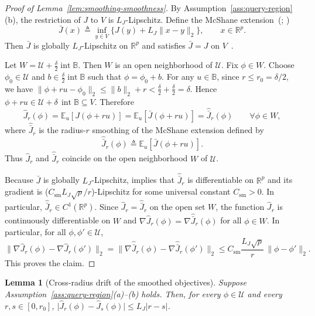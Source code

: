 \documentclass[11pt, letterpaper, oneside, reqno]{amsart}
\newcommand{\R}{\mathbb{R}}
\newcommand{\Let}{\triangleq}
\newtheorem{lemma}{Lemma}
\begin{document}
\begin{proof}[Proof of Lemma~\ref{lem:smoothing-smoothness}]
By Assumption~\ref{ass:query-region}(b), the restriction of $J$ to $V$ is $L_J$-Lipschitz.
Define the McShane extension~(\cite{ref:mcshane1934extension}; \cite[Definition~2.1]{ref:petrakis2020mcshane})
\[
\bar J(x)
\Let \inf_{y\in V}\bigl\{J(y)+L_J\|x-y\|_2\bigr\},
\qquad x\in\R^p.
\]
Then $\bar J$ is globally $L_J$-Lipschitz on $\R^p$ and satisfies $\bar J = J$ on $V$~\cite[Theorem~2.3]{ref:petrakis2020mcshane}.

Let $W = \mathcal U + \frac{\delta}{2}\operatorname{int}\mathbb B$.
Then $W$ is an open neighborhood of $\mathcal U$.
Fix $\phi\in W$. Choose $\phi_0\in\mathcal U$ and $b\in \frac{\delta}{2}\operatorname{int}\mathbb B$ such that $\phi=\phi_0+b$.
For any $u\in\mathbb B$, since $r\le r_0=\delta/2$, we have
$\|\phi+r u-\phi_0\|_2
\le \|b\|_2+r
< \frac{\delta}{2}+\frac{\delta}{2}
= \delta$.
Hence
$\phi+r u \in \mathcal U+\delta\,\operatorname{int}\mathbb B \subseteq V$.
Therefore
\[
\hat J_r(\phi)
= \mathbb E_u[J(\phi+r u)]
= \mathbb E_u[\bar J(\phi+r u)]
= \widehat{\bar J}_r(\phi)
\qquad \forall \phi\in W,
\]
where $\widehat{\bar J}_r$ is the radius-$r$ smoothing of the McShane extension defined by
\[
\widehat{\bar J}_r(\phi)\Let \mathbb E_u[\bar J(\phi+r u)].
\]
Thus $\hat J_r$ and $\widehat{\bar J}_r$ coincide on the open neighborhood $W$ of $\mathcal U$.

Because $\bar J$ is globally $L_J$-Lipschitz, \cite[Proposition~2.2]{ref:lin2022gradient} implies that $\widehat{\bar J}_r$ is differentiable on $\R^p$ and its gradient is ($C_{\mathrm{sm}}L_J\sqrt p/r$)-Lipschitz for some universal constant $C_{\mathrm{sm}}>0$. In particular, $\widehat{\bar J}_r \in C^1(\R^p)$.
Since $\hat J_r=\widehat{\bar J}_r$ on the open set $W$, the function $\hat J_r$ is continuously differentiable on $W$ and
$\nabla \hat J_r(\phi)=\nabla \widehat{\bar J}_r(\phi)$ for all $\phi\in W$.
In particular, for all $\phi,\phi'\in\mathcal U$,
\[
\|\nabla \hat J_r(\phi)-\nabla \hat J_r(\phi')\|_2
=
\|\nabla \widehat{\bar J}_r(\phi)-\nabla \widehat{\bar J}_r(\phi')\|_2
\le C_{\mathrm{sm}}\frac{L_J\sqrt p}{r}\,\|\phi-\phi'\|_2.
\]
This proves the claim.
\end{proof}


\begin{lemma}[Cross-radius drift of the smoothed objectives]
\label{lem:smoothing-drift}
Suppose Assumption~\ref{ass:query-region}(a)--(b) holds.
Then, for every $\phi\in\mathcal U$ and every $r,s\in[0,r_0]$,
$\big|\hat J_r(\phi)-\hat J_s(\phi)\big| \le L_J|r-s|$.
\end{lemma}
\end{document}
